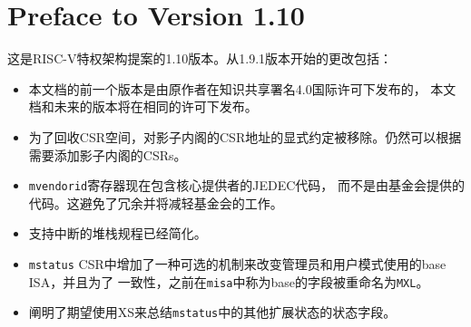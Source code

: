 \newpage

\section*{Preface to Version 1.10}

这是RISC-V特权架构提案的1.10版本。从1.9.1版本开始的更改包括：

\begin{itemize}
  \parskip 0pt
  \itemsep 1pt
\item 本文档的前一个版本是由原作者在知识共享署名4.0国际许可下发布的，
本文档和未来的版本将在相同的许可下发布。
\item 为了回收CSR空间，对影子内阁的CSR地址的显式约定被移除。仍然可以根据需要添加影子内阁的CSRs。
\item {\tt mvendorid}寄存器现在包含核心提供者的JEDEC代码，
而不是由基金会提供的代码。这避免了冗余并将减轻基金会的工作。
\item 支持中断的堆栈规程已经简化。
\item {\tt mstatus} CSR中增加了一种可选的机制来改变管理员和用户模式使用的base ISA，并且为了
一致性，之前在{\tt misa}中称为base的字段被重命名为{\tt MXL}。
\item 阐明了期望使用XS来总结{\tt mstatus}中的其他扩展状态的状态字段。

\end{itemize}
